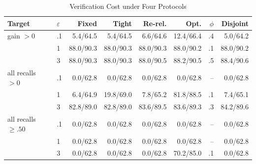 \begin{table}[t]
\caption{Verification Cost under Four Protocols}
\label{tab:cost}\small\setlength{\tabcolsep}{1.6pt}
\centering
\begin{tabular}{@{}llrrrrrr@{}}\toprule
Target & $\varepsilon$ & Fixed & Tight & Re-rel. & Opt. & $\phi$ & Disjoint \\
\midrule
gain $>0$ & .1 & 5.4/64.5 & 5.4/64.5 & 6.6/64.6 & 12.4/66.4 & .4 & 5.0/64.2 \\
 & 1 & 88.0/90.3 & 88.0/90.3 & 88.0/90.3 & 88.0/90.2 & .1 & 88.0/90.2 \\
 & 3 & 88.0/90.3 & 88.0/90.3 & 88.0/90.5 & 88.2/90.5 & .5 & 88.4/90.6 \\
all recalls $>0$ & .1 & 0.0/62.8 & 0.0/62.8 & 0.0/62.8 & 0.0/62.8 & -- & 0.0/62.8 \\
 & 1 & 6.4/64.9 & 19.8/69.0 & 7.8/65.2 & 81.8/88.5 & .1 & 7.4/65.1 \\
 & 3 & 82.8/89.0 & 82.8/89.0 & 83.6/89.5 & 83.6/89.3 & .3 & 84.2/89.6 \\
all recalls $\ge.50$ & .1 & 0.0/62.8 & 0.0/62.8 & 0.0/62.8 & 0.0/62.8 & -- & 0.0/62.8 \\
 & 1 & 0.0/62.8 & 0.0/62.8 & 0.0/62.8 & 0.0/62.8 & -- & 0.0/62.8 \\
 & 3 & 0.0/62.8 & 0.0/62.8 & 0.0/62.8 & 70.2/85.0 & .1 & 0.0/62.8 \\
\bottomrule\end{tabular}
\end{table}
